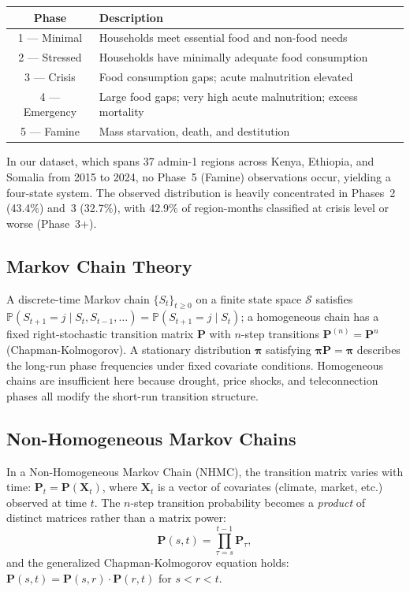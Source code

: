 \documentclass[11pt,letterpaper]{article}
\newcommand{\Prob}{\mathbb{P}}
\begin{document}
\begin{center}
\begin{tabular}{cl}
\toprule
\textbf{Phase} & \textbf{Description} \\
\midrule
1 --- Minimal     & Households meet essential food and non-food needs \\
2 --- Stressed    & Households have minimally adequate food consumption \\
3 --- Crisis      & Food consumption gaps; acute malnutrition elevated \\
4 --- Emergency   & Large food gaps; very high acute malnutrition; excess mortality \\
5 --- Famine      & Mass starvation, death, and destitution \\
\bottomrule
\end{tabular}
\end{center}

\noindent In our dataset, which spans 37 admin-1 regions across Kenya, Ethiopia, and Somalia from 2015 to 2024, no Phase~5 (Famine) observations occur, yielding a four-state system. The observed distribution is heavily concentrated in Phases~2 (43.4\%) and~3 (32.7\%), with 42.9\% of region-months classified at crisis level or worse (Phase~3+).

\subsection{Markov Chain Theory}

A discrete-time Markov chain $\{S_t\}_{t \geq 0}$ on a finite state space $\mathcal{S}$ satisfies $\Prob(S_{t+1} = j \mid S_t, S_{t-1}, \ldots) = \Prob(S_{t+1} = j \mid S_t)$; a homogeneous chain has a fixed right-stochastic transition matrix $\mathbf{P}$ with $n$-step transitions $\mathbf{P}^{(n)} = \mathbf{P}^n$ (Chapman-Kolmogorov). A stationary distribution $\boldsymbol{\pi}$ satisfying $\boldsymbol{\pi}\mathbf{P} = \boldsymbol{\pi}$ describes the long-run phase frequencies under fixed covariate conditions. Homogeneous chains are insufficient here because drought, price shocks, and teleconnection phases all modify the short-run transition structure.

\subsection{Non-Homogeneous Markov Chains}

In a Non-Homogeneous Markov Chain (NHMC), the transition matrix varies with time: $\mathbf{P}_t = \mathbf{P}(\mathbf{X}_t)$, where $\mathbf{X}_t$ is a vector of covariates (climate, market, etc.) observed at time $t$. The $n$-step transition probability becomes a \emph{product} of distinct matrices rather than a matrix power:
\begin{equation}\label{eq:multistep}
  \mathbf{P}(s, t) = \prod_{\tau=s}^{t-1} \mathbf{P}_\tau,
\end{equation}
and the generalized Chapman-Kolmogorov equation holds: $\mathbf{P}(s,t) = \mathbf{P}(s,r) \cdot \mathbf{P}(r,t)$ for $s < r < t$.
\end{document}

